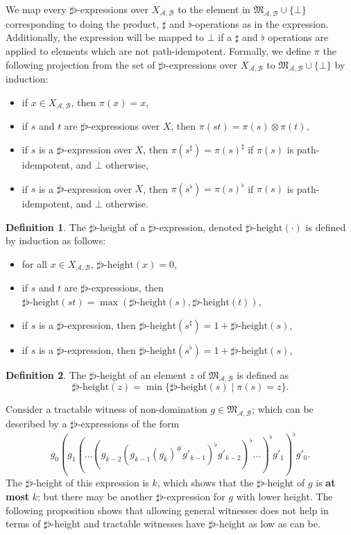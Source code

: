 \documentclass[10pt,a4paper]{amsart}
\theoremstyle{definition}
\newtheorem{defi}[defi]{Definition}
\numberwithin{equation}{section}
\theoremstyle{remark}
\newcommand{\ideal}{\mathfrak{M}}
\newcommand{\autA}{\mathcal{A}}
\newcommand{\autB}{\mathcal{B}}
\theoremstyle{remark}
\begin{document}
We map every $\sharp\flat$-expressions over $X_{\autA, \autB}$ to the element in $\ideal_{\autA,\autB}\cup \{\bot\}$ corresponding to doing the product, $\sharp$ and $\flat$-operations as in the expression. Additionally, the expression will be mapped to $\bot$ if a $\sharp$ and $\flat$ operations are applied to elements which are not path-idempotent. Formally, we define $\pi$ the following projection from the set of $\sharp\flat$-expressions over $X_{\autA,\autB}$ to $\ideal_{\autA,\autB}\cup \{\bot\}$ by induction:
\begin{itemize}
\item if $x \in X_{\autA,\autB}$, then $\pi(x) = x$,
\item if $s$ and $t$ are $\sharp\flat$-expressions over $X$, then $\pi(st) = \pi(s)\otimes \pi(t)$,
\item if $s$ is a $\sharp\flat$-expression over $X$, then $\pi(s^\sharp) = \pi(s)^\sharp$ if $\pi(s)$ is path-idempotent, and $\bot$ otherwise,
\item if $s$ is a $\sharp\flat$-expression over $X$, then $\pi(s^\flat) = \pi(s)^\flat$ if $\pi(s)$ is path-idempotent, and $\bot$ otherwise.
\end{itemize}


\newcommand{\sfh}[1]{\sharp\flat\text{-height}(#1)}

\begin{defi}
The $\sharp\flat$-height of a $\sharp\flat$-expression, denoted $\sfh{\cdot}$ is defined by induction as follows:
\begin{itemize}
\item for all $x \in X_{\autA,\autB}$, $\sfh{x} = 0$,
\item if $s$ and $t$ are $\sharp\flat$-expressions, then $\sfh{st} = \max(\sfh{s},\sfh{t})$,
\item if $s$ is a $\sharp\flat$-expression, then $\sfh{s^\sharp} = 1+ \sfh{s}$,
\item if $s$ is a $\sharp\flat$-expression, then $\sfh{s^\flat} = 1+ \sfh{s}$,
\end{itemize} 
\end{defi}


\begin{defi}
\label{defi:sfheightelement}
The $\sharp\flat$-height of an element $z$ of $\ideal_{\autA,\autB}$ is defined as 
$$\sharp\flat\text{-height}(z) = \min\{\sfh{s}\mid\pi(s)=z\}.$$
\end{defi}

Consider a tractable witness of non-domination $g\in \ideal_{\autA,\autB}$; which can be described by a $\sharp\flat$-expressions of the form
\begin{equation*}\label{eq:sftractable}g_0 (g_1 (\dots (g_{k-2} ( g_{k-1} (g_{k})^\#g'_{k-1})^\flat g'_{k-2})^\flat \dots)^\flat g'_{1})^\flat g'_{0}.\end{equation*} 
The $\sharp\flat$-height of this expression is $k$, which shows that the $\sharp\flat$-height of $g$ is \textbf{at most} $k$; but there may be another $\sharp\flat$-expression for $g$ with lower height. The following proposition shows that allowing general witnesses does not help in terms of $\sharp\flat$-height and tractable witnesses have $\sharp\flat$-height as low as can be.
\end{document}
